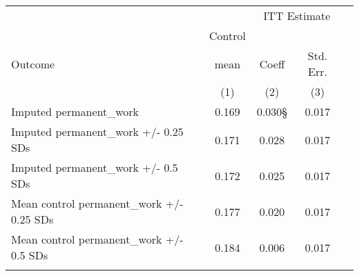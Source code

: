 \begin{tabular}{lcccc}
\hline \noalign{\smallskip} &  & \multicolumn{2}{c}{{ ITT Estimate}} & \\
\cline{3-4} & Control &  &  & \\
Outcome & mean & Coeff & Std. Err. & \\
 & (1) & (2) & (3) & \\
\noalign{\smallskip}\hline \noalign{\smallskip}Imputed permanent\_work & 0.169 & 0.030§ & 0.017 & \\
Imputed permanent\_work +/- 0.25 SDs & 0.171 & 0.028 & 0.017 & \\
Imputed permanent\_work +/- 0.5 SDs & 0.172 & 0.025 & 0.017 & \\
Mean control permanent\_work +/- 0.25 SDs & 0.177 & 0.020 & 0.017 & \\
Mean control permanent\_work +/- 0.5 SDs & 0.184 & 0.006 & 0.017 & \\
\noalign{\smallskip}\hline\end{tabular}\\
